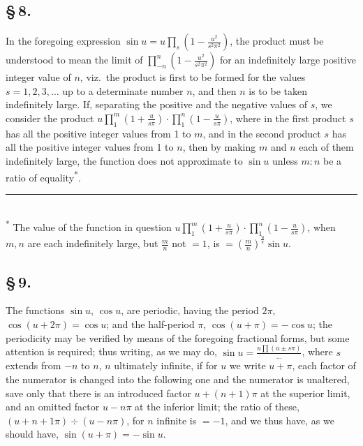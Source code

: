 \documentclass[11pt,a4paper]{book}
\begin{document}
\subsection*{\S\,8.}

In the foregoing expression $\sin u = u\prod_{s}(1 - \frac{u^{2}}{s^{2}\pi^{2}})$, the product must be understood to mean the limit of $\prod_{-n}^{n}(1 - \frac{u^{2}}{s^{2}\pi^{2}})$ for an indefinitely large positive integer value of $n$, viz.\ the product is first to be formed for the values $s = 1, 2, 3, \ldots$ up to a determinate number $n$, and then $n$ is to be taken indefinitely large. If, separating the positive and the negative values of $s$, we consider the product $u\prod_{1}^{m}(1 + \frac{u}{s\pi}) \cdot \prod_{1}^{n}(1 - \frac{u}{s\pi})$, where in the first product $s$ has all the positive integer values from 1 to $m$, and in the second product $s$ has all the positive integer values from 1 to $n$, then by making $m$ and $n$ each of them indefinitely large, the function does not approximate to $\sin u$ unless $m : n$ be a ratio of equality\textsuperscript{*}.

\smallskip
\small\noindent\rule{0.4\textwidth}{0.4pt}\\
\textsuperscript{*} The value of the function in question $u\prod_{1}^{m}(1 + \frac{u}{s\pi}) \cdot \prod_{1}^{n}(1 - \frac{u}{s\pi})$, when $m, n$ are each indefinitely large, but $\frac{m}{n}$ not $= 1$, is $= \left(\frac{m}{n}\right)^{\frac{u}{\pi}}\sin u$.
\normalsize

\subsection*{\S\,9.}

The functions $\sin u$, $\cos u$, are periodic, having the period $2\pi$, $\cos(u + 2\pi) = \cos u$; and the half-period $\pi$, $\cos(u + \pi) = -\cos u$; the periodicity may be verified by means of the foregoing fractional forms, but some attention is required; thus writing, as we may do, $\sin u = \frac{u\prod(u \pm s\pi)}{\ldots}$, where $s$ extends from $-n$ to $n$, $n$ ultimately infinite, if for $u$ we write $u + \pi$, each factor of the numerator is changed into the following one and the numerator is unaltered, save only that there is an introduced factor $u + (n + 1)\pi$ at the superior limit, and an omitted factor $u - n\pi$ at the inferior limit; the ratio of these, $(u + n + 1\pi) \div (u - n\pi)$, for $n$ infinite is $= -1$, and we thus have, as we should have, $\sin(u + \pi) = -\sin u$.
\end{document}
